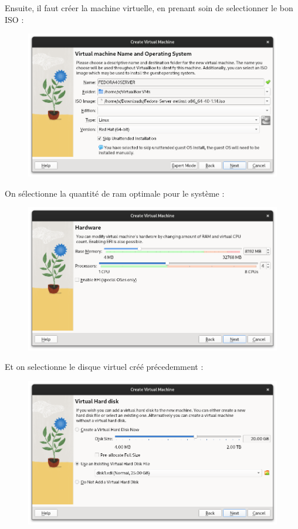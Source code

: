 \documentclass{article}
\begin{document}
Ensuite, il faut créer la machine virtuelle, en prenant soin de selectionner le bon ISO :

\begin{figure}[h!]
		\centering
		\includegraphics[width=1\textwidth]{vbox2.png}
\end{figure}

\newpage

On sélectionne la quantité de ram optimale pour le système :

\begin{figure}[h!]
		\centering
		\includegraphics[width=1\textwidth]{vbox3.png}
\end{figure}

Et on selectionne le disque virtuel créé précedemment :

\begin{figure}[h!]
		\centering
		\includegraphics[width=1\textwidth]{vbox4.png}
\end{figure}
\end{document}
